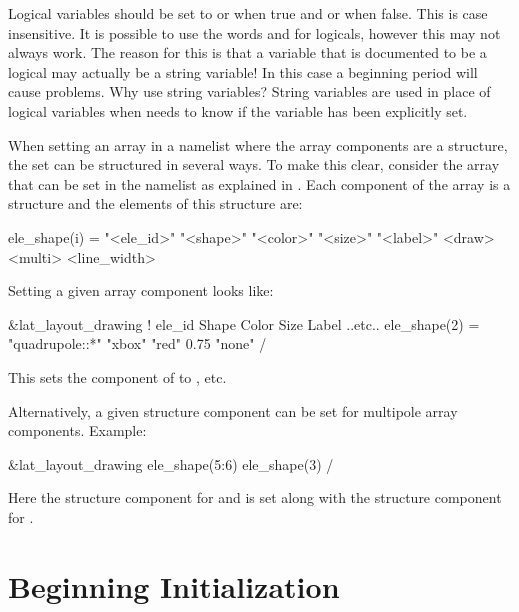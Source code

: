 Logical variables should be set to  or  when true and  or  when
false. This is case insensitive. It is possible to use the words  and  for
logicals, however this may not always work. The reason for this is that a variable that is
documented to be a logical may actually be a string variable! In this case a beginning period will
cause problems. Why use string variables? String variables are used in place of logical variables
when \tao needs to know if the variable has been explicitly set.

When setting an array in a namelist where the array components are a structure, the set can be
structured in several ways. To make this clear, consider the  array that can be set
in the  namelist as explained in . Each component
of the  array is a structure and the elements of this structure are:
\begin{example}
  ele_shape(i) = "<ele_id>" "<shape>" "<color>" "<size>" "<label>" <draw> <multi> <line_width>
\end{example}
Setting a given  array component looks like:
\begin{example}
  &lat_layout_drawing
    !               ele_id                  Shape      Color     Size  Label  ..etc..
    ele_shape(2) = "quadrupole::*"          "xbox"     "red"     0.75  "none" 
  /
\end{example}
This sets the  component of  to , etc.

Alternatively, a given structure component can be set for multipole array components. Example:
\begin{example}
  &lat_layout_drawing
    ele_shape(5:6)%
    ele_shape(3)%
  /
\end{example}
Here the  structure component for  and  is set along
with the  structure component for .

\section{Beginning Initialization}
\label{s:init.global} 

